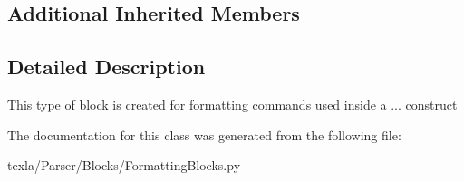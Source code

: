 \subsection*{Additional Inherited Members}


\subsection{Detailed Description}
\begin{DoxyVerb}This type of block is created for formatting
commands used inside a {...} construct\end{DoxyVerb}
 

The documentation for this class was generated from the following file\+:\begin{DoxyCompactItemize}
\item 
texla/\+Parser/\+Blocks/Formatting\+Blocks.\+py\end{DoxyCompactItemize}
